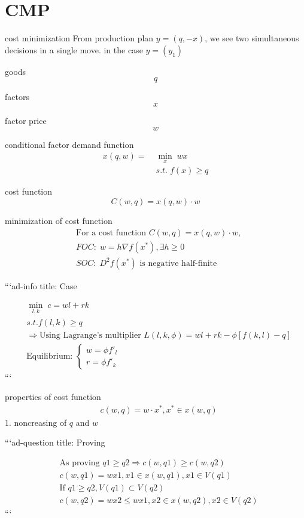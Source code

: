 \documentclass{article}
\begin{document}
\section{CMP}
cost minimization
From production plan $y=(q,-x)$, we see two simultaneous decisions in a single move.
in the case $y=(y_{1})$

goods
$$q$$

factors
$$x$$

factor price
$$w$$

conditional factor demand function
\begin{align}
x(q,w)=\;&\mathop{min}\limits_{x}\; wx
\\&s.t.\;f(x)\geqslant q
\end{align}

cost function
$$C(w,q)=x(q,w)\cdot w$$

minimization of cost function
\begin{align}
& \text{For a cost function } C(w,q)=x(q,w)\cdot w,
\\& FOC: \; w=h \nabla f(x^{*}), \exists h\ge 0
\\&SOC: \; D^{2}f(x^{*}) \text{ is negative half-finite}
\end{align}

```ad-info
title: Case

\begin{align}
&\mathop{min}\limits_{l,k} \;c=wl+rk
\\&s.t. f(l,k)\ge q
\\&\Rightarrow \text{Using Lagrange's multiplier }L(l,k,\phi)=wl+rk-\phi[f(k,l)-q]
\\& \text{Equilibrium: } \begin{cases}
w=\phi f'_{l} \\
r=\phi f'_{k}\end{cases}
\end{align}
```

properties of cost function
\begin{align}
&c(w,q)=w\cdot x^{*},x^{*}\in x(w,q)
\end{align}
1.
noncreasing of $q$ and $w$

```ad-question
title: Proving

\begin{align}
&\text{As proving }q1\ge q2 \Rightarrow c(w,q1)\ge c(w,q2)
\\&c(w,q1)=wx1,x1\in x(w,q1),x1 \in V(q1)
\\&\text{If }q1\ge q2, V(q1)\subset V(q2)
\\&c(w,q2)=wx2\le wx1,x2\in x(w,q2),x2 \in V(q2)
\end{align}
```
\end{document}
